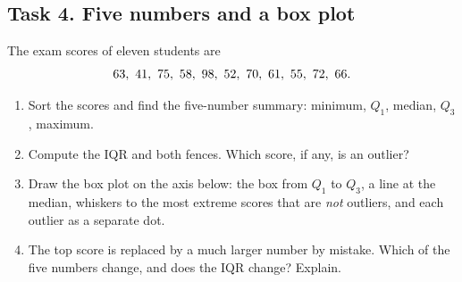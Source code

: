 \subsection*{Task 4. Five numbers and a box plot}
The exam scores of eleven students are
\[ 63,\ 41,\ 75,\ 58,\ 98,\ 52,\ 70,\ 61,\ 55,\ 72,\ 66. \]
\begin{enumerate}[label=(\alph*)]
  \item Sort the scores and find the five-number summary: minimum, $Q_1$, median, $Q_3$, maximum.
  \item Compute the IQR and both fences. Which score, if any, is an outlier?
  \item Draw the box plot on the axis below: the box from $Q_1$ to $Q_3$, a line at the median, whiskers to the most
        extreme scores that are \emph{not} outliers, and each outlier as a separate dot.
  \item The top score is replaced by a much larger number by mistake. Which of the five numbers change, and does the
        IQR change? Explain.
\end{enumerate}
\begin{center}
\end{center}

